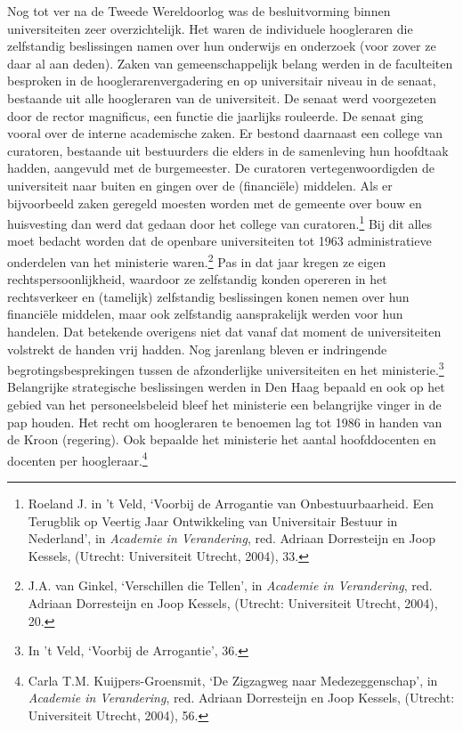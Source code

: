\documentclass[smallauthor, chapterhaspagenum, nochapterinheader, pagenuminheader,  bigchapnum,medium2, tocpages,  garamond, titleinheader]{jote-book}
\begin{document}
	Nog tot ver na de Tweede Wereldoorlog was de besluitvorming binnen universiteiten zeer overzichtelijk. Het waren de individuele hoogleraren die zelfstandig beslissingen namen over hun onderwijs en onderzoek (voor zover ze daar al aan deden). Zaken van gemeenschappelijk belang werden in de faculteiten besproken in de hooglerarenvergadering en op universitair niveau in de senaat, bestaande uit alle hoogleraren van de universiteit. De senaat werd voorgezeten door de rector magnificus, een functie die jaarlijks rouleerde. De senaat ging vooral over de interne academische zaken. Er bestond daarnaast een college van curatoren, bestaande uit bestuurders die elders in de samenleving hun hoofdtaak hadden, aangevuld met de burgemeester. De curatoren vertegenwoordigden de universiteit naar buiten en gingen over de (financiële) middelen. Als er bijvoorbeeld zaken geregeld moesten worden met de gemeente over bouw en huisvesting dan werd dat gedaan door het college van curatoren.\footnote{Roeland J. in 't Veld, ‘Voorbij de Arrogantie van Onbestuurbaarheid. Een Terugblik op Veertig Jaar Ontwikkeling van Universitair Bestuur in Nederland', in \emph{Academie in Verandering}, red. Adriaan Dorresteijn en Joop Kessels, (Utrecht: Universiteit Utrecht, 2004), 33.} Bij dit alles moet bedacht worden dat de openbare universiteiten tot 1963 administratieve onderdelen van het ministerie waren.\footnote{J.A. van Ginkel, ‘Verschillen die Tellen', in \emph{Academie in Verandering}, red. Adriaan Dorresteijn en Joop Kessels, (Utrecht: Universiteit Utrecht, 2004), 20.} Pas in dat jaar kregen ze eigen rechtspersoonlijkheid, waardoor ze zelfstandig konden opereren in het rechtsverkeer en (tamelijk) zelfstandig beslissingen konen nemen over hun financiële middelen, maar ook zelfstandig aansprakelijk werden voor hun handelen. Dat betekende overigens niet dat vanaf dat moment de universiteiten volstrekt de handen vrij hadden. Nog jarenlang bleven er indringende begrotingsbesprekingen tussen de afzonderlijke universiteiten en het ministerie.\footnote{In 't Veld, ‘Voorbij de Arrogantie', 36.} Belangrijke strategische beslissingen werden in Den Haag bepaald en ook op het gebied van het personeelsbeleid bleef het ministerie een belangrijke vinger in de pap houden. Het recht om hoogleraren te benoemen lag tot 1986 in handen van de Kroon (regering). Ook bepaalde het ministerie het aantal hoofddocenten en docenten per hoogleraar.\footnote{Carla T.M. Kuijpers-Groensmit, ‘De Zigzagweg naar Medezeggenschap', in \emph{Academie in Verandering}, red. Adriaan Dorresteijn en Joop Kessels, (Utrecht: Universiteit Utrecht, 2004), 56.}
\end{document}
